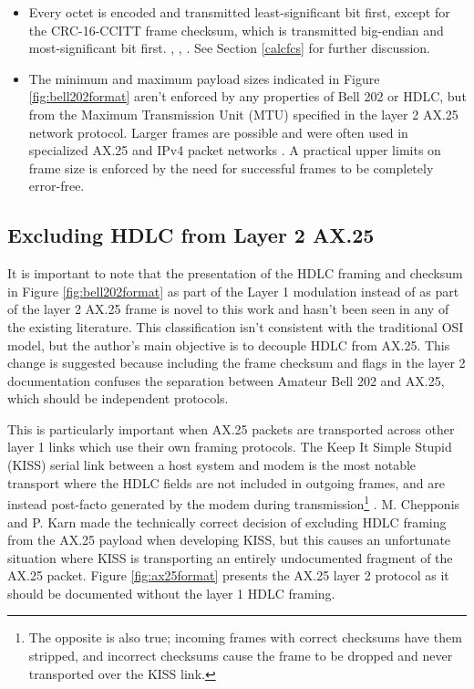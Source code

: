 \begin{itemize}
{			able to handle arbitrary strings of ones gracefully.}
	\item Every octet is encoded and transmitted least-significant bit first,
		except for the CRC-16-CCITT frame checksum, 
		which is transmitted big-endian
		and most-significant bit first.
		\cite[\S3.8]{ax25spec},
		\cite[\S8.1.1-2]{ituv42},
		\cite{n1vgphy}.
		See Section \ref{calcfcs} for further discussion.
	\item The minimum and maximum payload sizes indicated in Figure 
		\ref{fig:bell202format} aren't enforced by any properties of 
		Bell 202 or HDLC, but from the Maximum Transmission Unit (MTU)
		specified in the layer 2 AX.25 network protocol.
		Larger frames are possible and were often used in specialized 
		AX.25 and IPv4 packet networks \cite{pattersoninterview}.
		A practical upper limits on frame size is enforced by
		the need for successful frames to be completely error-free.


\end{itemize}

\subsection{Excluding HDLC from Layer 2 AX.25}

It is important to note that the presentation of the HDLC framing
and checksum
in Figure \ref{fig:bell202format} as part of the Layer 1 modulation 
instead of as part of the layer 2 AX.25 frame is 
novel to this work and hasn't been seen in any of the existing literature.
This classification isn't consistent with the traditional OSI model,
but the author's main objective is to decouple HDLC from AX.25.
This change is suggested because including the frame checksum and flags
in the layer 2 documentation confuses the separation between Amateur Bell 202 
and AX.25, which should be independent protocols.

This is particularly important when AX.25 packets are transported across 
other layer 1 links which use their own framing protocols.
The Keep It Simple Stupid (KISS) serial link between 
a host system and modem is the most notable
transport where the HDLC fields are not included in outgoing frames, 
and are instead 
post-facto generated by the modem during transmission\footnote{The opposite
	is also true; incoming frames with correct checksums have them stripped,
	and incorrect checksums cause the frame to be dropped and never
transported over the KISS link.} \cite{KISSspec}.
M. Chepponis and P. Karn made the technically correct decision of excluding 
HDLC framing from the AX.25 payload when developing KISS, but this causes
an unfortunate situation where KISS is transporting an entirely
undocumented fragment of the AX.25 packet. Figure \ref{fig:ax25format} 
presents the AX.25 layer 2 protocol as it should be documented without
the layer 1 HDLC framing.


